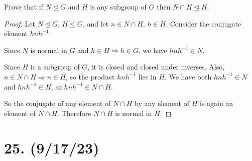 \documentclass{article}
\begin{document}
Prove that if $N \unlhd G$ and $H$ is any subgroup of $G$ then $N \cap H \unlhd H$.

\begin{proof}
    Let $N \unlhd G$, $H \leq G$, and let $n \in N \cap H$, $h \in H$. Consider the conjugate element $hnh^{-1}$.

    Since $N$ is normal in $G$ and $h \in H \Rightarrow h \in G$, we have $hnh^{-1} \in N$.

    Since $H$ is a subgroup of $G$, it is closed and closed under inverses. Also, $n \in N \cap H \Rightarrow n \in H$, so the product $hnh^{-1}$ lies in $H$. We have both $hnh^{-1} \in N$ and $hnh^{-1} \in H$, so $hnh^{-1} \in N \cap H$.

    So the conjugate of any element of $N \cap H$ by any element of $H$ is again an element of $N \cap H$. Therefore $N \cap H$ is normal in $H$.
\end{proof}

\section*{25. (9/17/23)}
\end{document}
